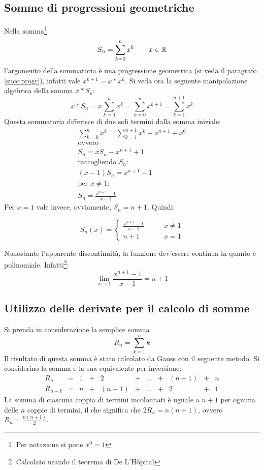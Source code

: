 \subsection{Somme di progressioni geometriche}
\label{sum:geompar}
Nella somma\footnote{Per notazione si pone $x^0=1$}
\[
	S_n=\sum_{k=0}^n x^k\qquad x\in\mathbb{R}
\]
l'argomento della sommatoria è una progressione geometrica (si veda il paragrafo \vref{succ:progr}), infatti vale $x^{k+1}=x*x^k$. Si veda ora la seguente manipolazione algebrica della somma $x*S_n$:
\[
	x*S_n=x\sum_{k=0}^n x^k=\sum_{k=0}^n x^{k+1}=\sum_{k=1}^{n+1} x^k
\]
Questa sommatoria differisce di due soli termini dalla somma iniziale:
\begin{gather*}
	\sum_{k=0}^n x^k=\sum_{k=1}^{n+1} x^k-x^{n+1}+x^0\\
	\text{ovvero}\\
	S_n=xS_n-x^{n+1}+1\\
	\text{raccogliendo $S_n$:}\\
	(x-1)S_n=x^{n+1}-1\\
	\text{per $x\neq1$:}\\
	S_n=\frac{x^{n+1}-1}{x-1}
\end{gather*}
Per $x=1$ vale invece, ovviamente, $S_n=n+1$. Quindi:
\begin{prop}
	\label{sum:geom}
	\[
		S_n(x)=
		\begin{cases}
			\frac{x^{n+1}-1}{x-1}\qquad & x\neq1 \\
			n+1\qquad                   & x=1
		\end{cases}
	\]
\end{prop}
Nonostante l'apparente discontinuità, la funzione dev'essere continua in quanto è polinomiale. Infatti\footnote{Calcolato usando il teorema di De L'Hôpital}:
\[
	\lim_{x\to1}\frac{x^{n+1}-1}{x-1}=n+1
\]


\subsection[Somma tramite derivata]{Utilizzo delle derivate per il calcolo di somme}
Si prenda in considerazione la semplice somma
\[
	R_n=\sum_{k=1}^n k
\]
Il risultato di questa somma è stato calcolato da Gauss con il seguente metodo. Si considerino la somma e la sua equivalente per inversione:
\[
	\begin{array}{cccccccccccc}
		R_n     & = & 1 & + & 2     & + & \dots & + & (n-1) & + & n \\
		R_{n-k} & = & n & + & (n-1) & + & \dots & + & 2     & + & 1
	\end{array}
\]
La somma di ciascuna coppia di termini incolonnati è uguale a $n+1$ per ognuna delle $n$ coppie di termini, il che significa che $2R_n=n(n+1)$, ovvero $R_n=\frac{n(n+1)}{2}$.

